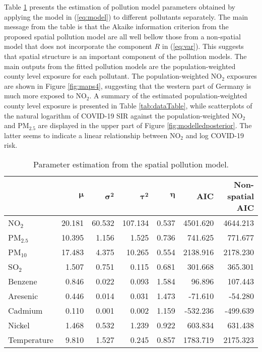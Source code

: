 \documentclass[12,]{article}
\begin{document}
Table \ref{tab:polParameter} presents the estimation of pollution model
parameters obtained by applying the model in (\ref{eq:model}) to
different pollutants separately. The main message from the table is that
the Akaike information criterion \autocite[AIC,][]{Akaike1973} from the
proposed spatial pollution model are all well bellow those from a
non-spatial model that does not incorporate the component \(R\) in
(\ref{eq:var}). This suggests that spatial structure is an important
component of the pollution models. The main outputs from the fitted
pollution models are the population-weighted county level exposure for
each pollutant. The population-weighted NO\(_2\) exposures are shown in
Figure \ref{fig:maps4}, suggesting that the western part of Germany is
much more exposed to NO\(_2\). A summary of the estimated
population-weighted county level exposure is presented in Table
\ref{tab:dataTable}, while scatterplots of the natural logarithm of
COVID-19 SIR against the population-weighted NO\(_2\) and PM\(_{2.5}\)
are displayed in the upper part of Figure \ref{fig:modelledposterior}.
The latter seems to indicate a linear relationship between NO\(_2\) and
log COVID-19 risk.

\begin{table}

\caption{\label{tab:polParameter}Parameter estimation from the spatial pollution model.}
\centering
\begin{tabular}[t]{lrrrrrr}
\toprule
\textbf{ } & \textbf{$\symbf{\mu}$} & \textbf{$\symbf{\sigma^2}$} & \textbf{$\symbf{\tau^2}$} & \textbf{$\symbf{\eta}$} & \textbf{AIC} & \textbf{Non-spatial AIC}\\
\midrule
NO$_2$ & 20.181 & 60.532 & 107.134 & 0.537 & 4501.620 & 4644.213\\
PM$_{2.5}$ & 10.395 & 1.156 & 1.525 & 0.736 & 741.625 & 771.677\\
PM$_{10}$ & 17.483 & 4.375 & 10.265 & 0.554 & 2138.916 & 2178.230\\
SO$_2$ & 1.507 & 0.751 & 0.115 & 0.681 & 301.668 & 365.301\\
Benzene & 0.846 & 0.022 & 0.093 & 1.584 & 96.896 & 107.443\\
Aresenic & 0.446 & 0.014 & 0.031 & 1.473 & -71.610 & -54.280\\
Cadmium & 0.110 & 0.001 & 0.002 & 1.159 & -532.236 & -499.639\\
Nickel & 1.468 & 0.532 & 1.239 & 0.922 & 603.834 & 631.438\\
Temperature & 9.810 & 1.527 & 0.245 & 0.857 & 1783.719 & 2175.323\\
\bottomrule
\end{tabular}
\end{table}
\end{document}
